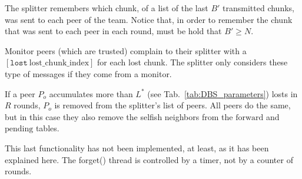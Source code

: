 
\label{sec:free_riding_control}

The splitter remembers which chunk, of a list of the last $B'$
transmitted chunks, was sent to each peer of the team. Notice that, in
order to remember the chunk that was sent to each peer in each round,
must be hold that $B'\ge N$. 

Monitor peers (which are trusted) complain to their splitter with a
$[\mathtt{lost}~\text{lost\_chunk\_index}]$ for each lost chunk. The
splitter only considers these type of messages if they come from a
monitor.

If a peer $P_o$ accumulates more than $L^*$ (see
Tab.~\ref{tab:DBS_parameters}) losts in $R$ rounds, $P_o$ is removed
from the splitter's list of peers. All peers do the same, but in this
case they also remove the selfish neighbors from the $\text{forward}$
and $\text{pending}$ tables.


\begin{notex}
This last functionality has not been implemented, at least, as it has
been explained here. The forget() thread is controlled by a timer, not
by a counter of rounds.
\end{notex}

